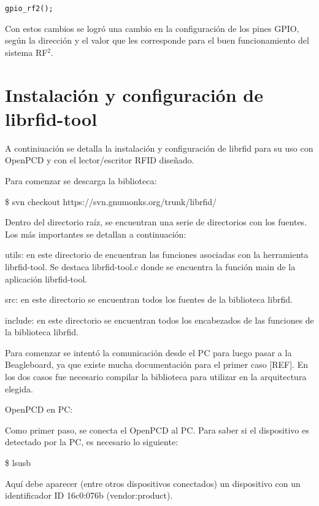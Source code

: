 \begin{verbatim}
gpio_rf2();
\end{verbatim}

Con estos cambios se logró una cambio en la configuración de los pines GPIO, según la dirección y el valor que les corresponde para el buen funcionamiento del sistema RF$^{2}$.


\section{Instalación y configuración de librfid-tool}\label{ins_conf_librfid}

A continiuación se detalla la instalación y configuración de librfid para su uso con OpenPCD y con el lector/escritor RFID diseñado.

Para comenzar se descarga la biblioteca:

\bigskip
\centerline{\$ svn checkout https://svn.gnumonks.org/trunk/librfid/}

\bigskip
Dentro del directorio raíz, se encuentran una serie de directorios con los fuentes. Los más importantes se detallan a continuación:

\bigskip
utils: en este directorio de encuentran las funciones asociadas con la herramienta librfid-tool. Se destaca librfid-tool.c donde se encuentra la función main de la aplicación librfid-tool.

\bigskip
src: en este directorio se encuentran todos los fuentes de la biblioteca librfid.

\bigskip
include: en este directorio se encuentran todos los encabezados de las funciones de la biblioteca librfid.


\bigskip
{}

\bigskip
Para comenzar se intentó la comunicación desde el PC para luego pasar a la Beagleboard, ya que existe mucha documentación para el primer caso [REF]. En los dos casos fue necesario compilar la biblioteca para utilizar en la arquitectura elegida.

\bigskip
OpenPCD en PC:

\bigskip
Como primer paso, se conecta el OpenPCD al PC. Para saber si el dispositivo es detectado por la PC, es necesario lo siguiente:

\bigskip
\centerline{\$ lsusb}

\bigskip
Aquí debe aparecer (entre otros dispositivos conectados) un dispositivo con un identificador ID 16c0:076b (vendor:product). 

